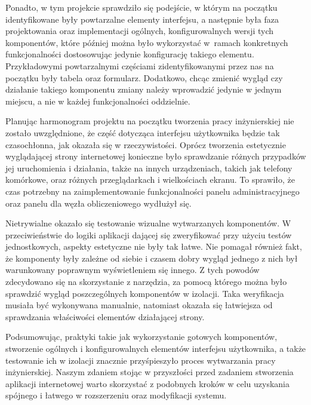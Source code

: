 \documentclass[a4paper,11pt,twoside]{report}
\theoremstyle{definition}
\begin{document}
            Ponadto, w tym projekcie sprawdziło się podejście, w którym na początku identyfikowane były powtarzalne elementy interfejsu, a następnie była faza projektowania oraz implementacji ogólnych, konfigurowalnych wersji tych komponentów, które później można było wykorzystać w~ramach konkretnych funkcjonalności dostosowując jedynie konfigurację takiego elementu.
            Przykładowymi powtarzalnymi częściami zidentyfikowanymi przez nas na początku były tabela oraz formularz. Dodatkowo, chcąc zmienić wygląd czy działanie takiego komponentu zmiany należy wprowadzić jedynie w jednym miejscu, a nie w każdej funkcjonalności oddzielnie.
        
            Planując harmonogram projektu na początku tworzenia pracy inżynierskiej nie zostało uwzględnione, że część dotycząca interfejsu użytkownika będzie tak czasochłonna, jak okazała się w rzeczywistości.
            Oprócz tworzenia estetycznie wyglądającej strony internetowej konieczne było sprawdzanie różnych przypadków jej uruchomienia i działania, także na innych urządzeniach, takich jak telefony komórkowe, oraz różnych przeglądarkach i wielkościach ekranu. To sprawiło, że czas potrzebny na zaimplementowanie funkcjonalności panelu administracyjnego oraz panelu dla węzła obliczeniowego wydłużył się.
            
            Nietrywialne okazało się testowanie wizualne wytwarzanych komponentów. W przeciwieństwie do logiki aplikacji dającej się zweryfikować przy użyciu testów jednostkowych, aspekty estetyczne nie były tak łatwe. Nie pomagał również fakt, że komponenty były zależne od siebie i czasem dobry wygląd jednego z nich był warunkowany poprawnym wyświetleniem się innego.
            Z tych powodów zdecydowano się na skorzystanie z narzędzia, za pomocą którego można było sprawdzić wygląd poszczególnych komponentów w izolacji. Taka weryfikacja musiała być wykonywana manualnie, natomiast okazała się łatwiejsza od sprawdzania właściwości elementów działającej strony.
            
            Podsumowując, praktyki takie jak wykorzystanie gotowych komponentów, stworzenie ogólnych i konfigurowalnych elementów interfejsu użytkownika, a także testowanie ich w izolacji znacznie przyśpieszyło proces wytwarzania pracy inżynierskiej.
            Naszym zdaniem stojąc w przyszłości przed zadaniem stworzenia aplikacji internetowej warto skorzystać z podobnych kroków w celu uzyskania spójnego i łatwego w rozszerzeniu oraz modyfikacji systemu.
        
\end{document}
